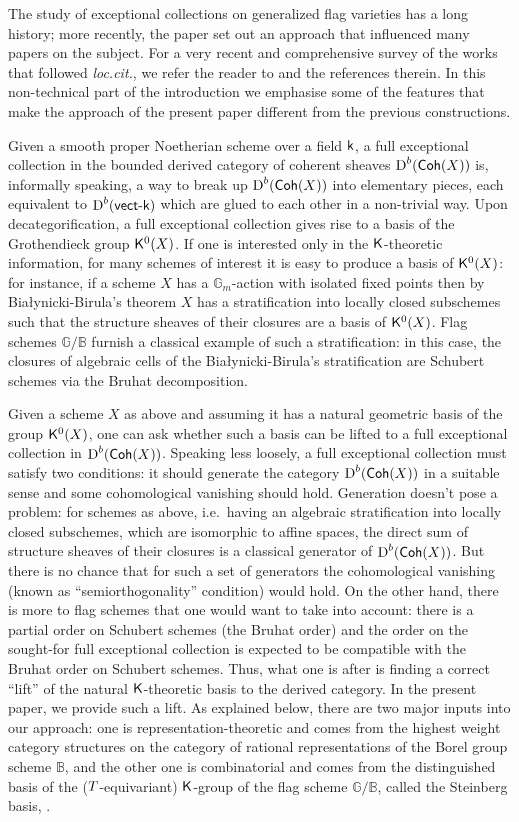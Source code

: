 \documentclass[sn-mathphys-num]{sn-jnl}%
\newcommand*{\Dd}{\mathop{\mathrm D\kern0pt}\nolimits}
\newcommand*{\Coh}{\mathop{\sf {Coh}}\nolimits}
\newcommand{\sk}{{\sf k}}
\newcommand{\sK}{{\sf K}}
\newcommand{\Gm}{\mathbb G}
\newcommand{\Bm}{\mathbb B}
\newcommand*{\vectk}{\mathop{\sf {vect}\textrm-\sk}\nolimits}
\newcommand{\bt}{\mathbf T}
\theoremstyle{definition}
\begin{document}
The study of exceptional collections on generalized flag varieties has a long history; more recently, the paper \cite{KuzPol} set out an approach that influenced many papers on the subject. For a very recent and comprehensive survey of the works that followed {\it loc.cit.}, we refer the reader to \cite{Fon} and the references therein. In this non-technical part of the introduction we emphasise some of the features that make the approach of the present paper different from the previous constructions.

Given a smooth proper Noetherian scheme over a field $\sk$, a full exceptional collection in the bounded derived category of coherent sheaves $\Dd ^b(\Coh(X))$ is, informally speaking, a way to break up $\Dd ^b(\Coh(X))$ into elementary pieces, each equivalent to $\Dd ^b(\vectk)$ which are glued to each other in a non-trivial way. 
Upon decategorification, a full exceptional collection gives rise to a basis of the Grothendieck group ${\sK}^0(X)$.
 If one is interested only in the $\sK$-theoretic information, for many schemes of interest it is easy to produce a basis of ${\sK}^0(X)$: for instance, if a scheme $X$ has a ${\mathbb G}_m$-action with isolated fixed points then by Bia\l{}ynicki-Birula's theorem $X$ has a stratification into locally closed subschemes such that the structure sheaves of their closures are a basis of ${\sK}^0(X)$. 
 Flag schemes $\Gm/\Bm$ furnish a classical example of such a stratification: in this case, the closures of algebraic cells of the  Bia\l{}ynicki-Birula's stratification are Schubert schemes via the Bruhat decomposition. 

Given a scheme $X$ as above and assuming it has a natural geometric basis of the group ${\sK}^0(X)$, one can ask whether such a basis can be lifted to a full exceptional collection in $\Dd ^b(\Coh(X))$. 
Speaking less loosely, a full exceptional collection must satisfy two conditions: it should generate the category $\Dd ^b(\Coh(X))$ in a suitable sense and some cohomological vanishing should hold. 
Generation doesn't pose a problem: for schemes as above, i.e.\ having an algebraic stratification into locally closed subschemes, which are isomorphic to affine spaces, the direct sum of structure sheaves of their closures is a classical generator of $\Dd ^b(\Coh(X))$. 
But there is no chance that for such a set of generators the cohomological vanishing (known as ``semiorthogonality'' condition) would hold. 
On the other hand, there is more to flag schemes that one would want to take into account: there is a partial order on Schubert schemes (the Bruhat order) and the order on the sought-for full exceptional collection is expected to be compatible with the Bruhat order on Schubert schemes. 
Thus, what one is after is finding a correct ``lift'' of the natural $\sK$-theoretic basis to the derived category. 
In the present paper, we provide such a lift. 
As explained below, there are two major inputs into our approach: one is representation-theoretic and comes from the highest weight category structures on the category of rational representations of the Borel group scheme $\Bm$, and the other one is combinatorial and comes from the distinguished basis of the ($\mathbb \bt$-equivariant) $\sK$-group of
the flag scheme $\Gm/\Bm$, called the Steinberg basis, \cite{St}.
\end{document}
